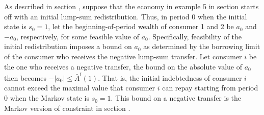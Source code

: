As described in section , suppose that the
economy in example 5 in section 
starts off with an initial lump-sum redistribution.
Thus, in period $0$ when the initial state
is $s_0=1$, let the beginning-of-period wealth of 
consumer 1 and 2 be $a_0$ and $-a_0$, respectively,
for some feasible value of $a_0$. Specifically, 
feasibility of the initial redistribution imposes a 
bound on $a_0$ as determined by the borrowing limit
of the consumer who receives the negative lump-sum
transfer. Let consumer $i$ be the one who receives
a negative transfer, the bound on the absolute value
of $a_0$ then becomes $-|a_0|\leq \bar A^i(1)$. That 
is, the initial indebtedness of consumer $i$ cannot 
exceed the maximal value that consumer $i$ can repay 
starting from period $0$ when the Markov state is 
$s_0=1$. This bound on a negative transfer is the
Markov version of constraint 
in section .

